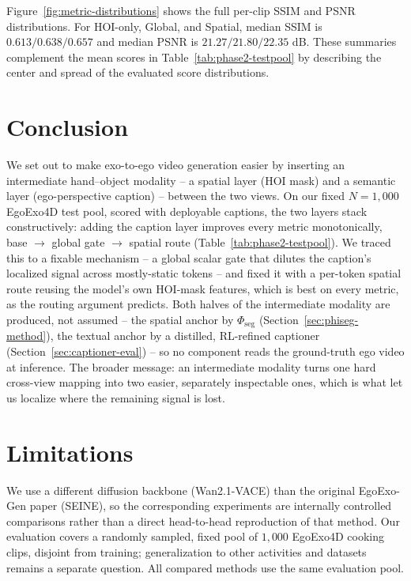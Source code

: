 \documentclass{article} %
\begin{document}
Figure~\ref{fig:metric-distributions} shows the full per-clip SSIM and PSNR
distributions. For HOI-only, Global, and Spatial, median SSIM is
$0.613/0.638/0.657$ and median PSNR is $21.27/21.80/22.35$ dB.
These summaries complement the mean scores in
Table~\ref{tab:phase2-testpool} by describing the center and spread of
the evaluated score distributions.

\section{Conclusion}
\label{sec:conclusion}

We set out to make exo-to-ego video generation easier by inserting an
intermediate hand--object modality -- a spatial layer (HOI mask) and a
semantic layer (ego-perspective caption) -- between the two views. On our
fixed $N{=}1{,}000$ EgoExo4D test pool, scored with deployable captions,
the two layers stack constructively: adding the caption layer improves every
metric monotonically, base $\to$ global gate $\to$ spatial route
(Table~\ref{tab:phase2-testpool}). We traced this to a fixable mechanism -- a
global scalar gate that dilutes the caption's localized signal across
mostly-static tokens -- and fixed it with a per-token spatial route reusing
the model's own HOI-mask features, which is best on every metric, as the
routing argument predicts. Both halves of the
intermediate modality are produced, not assumed -- the spatial anchor by
$\Phi_{\text{seg}}$ (Section~\ref{sec:phiseg-method}), the textual anchor by a
distilled, RL-refined captioner (Section~\ref{sec:captioner-eval}) -- so no
component reads the ground-truth ego video at inference. The broader
message: an intermediate modality turns one hard cross-view mapping into two
easier, separately inspectable ones, which is what let us localize where the
remaining signal is lost.

\section{Limitations}

We use a different diffusion backbone (Wan2.1-VACE) than the original
EgoExo-Gen paper \citep{xu2025egoexogen} (SEINE), so the corresponding
experiments are internally controlled comparisons rather than a direct
head-to-head reproduction of that method. Our evaluation covers a randomly
sampled, fixed pool of $1{,}000$ EgoExo4D cooking clips, disjoint from
training; generalization to other activities and datasets remains a separate
question. All compared methods use the same evaluation pool.
\end{document}

